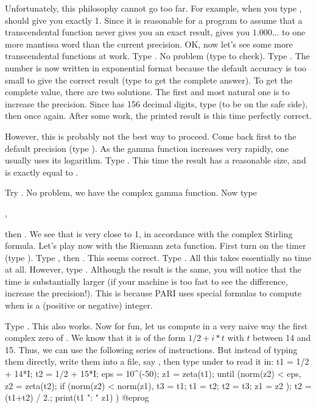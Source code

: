 Unfortunately, this philosophy cannot go too far. For example, when you
type ,  should give you exactly 1. Since it is reasonable for
a program to assume that a transcendental function never gives you an exact
result,  gives you $1.000\dots$ to one more mantissa word than the current
precision.
\medskip
OK, now let's see some more transcendental functions at work. Type
. No problem (type  to check). Type .
The number is now written in exponential format because the default
accuracy is too small to give the correct result (type  to get the
complete answer).
To get the complete value, there are two solutions. The first and most natural
one is to increase the precision. Since  has 156 decimal
digits, type  (to be on the safe side), then 
once again. After some work, the printed result is this time perfectly
correct.

However, this is probably not the best way to proceed. Come back first to the
default precision (type ). As the gamma function increases
very rapidly, one usually uses its logarithm. Type . This
time the result has a reasonable size, and is exactly equal to .

Try . No problem, we have the complex gamma function.
Now type

,

\noindent then . We see that  is very close to 1,
in accordance with the complex Stirling formula. \smallskip
%
Let's play now with the Riemann zeta function. First turn on the timer (type
\kbd{\#}). Type , then . This seems correct. Type
. All this takes essentially no time at all. However, type
. Although the result is the same, you will notice that the
time is substantially larger (if your machine is too fast to see the
difference, increase the precision!). This is because PARI uses special
formulas to compute  when  is a (positive or negative)
integer.

Type . This also works. Now for fun, let us compute in a
very naive way the first complex zero of . We know that it is
of the form $1/2 + i*t$ with $t$ between 14 and 15. Thus, we can use the
following series of instructions. But instead of typing them directly, write
them into a file, say , then type  under
 to read it in:
\bprog
{
  t1 = 1/2 + 14*I;
  t2 = 1/2 + 15*I; eps = 10^(-50);
  z1 = zeta(t1);
  until (norm(z2) < eps,
    z2 = zeta(t2);
    if (norm(z2) < norm(z1),
      t3 = t1; t1 = t2; t2 = t3; z1 = z2
    );
    t2 = (t1+t2) / 2.;
    print(t1 ": " z1)
  )
}
@eprog

